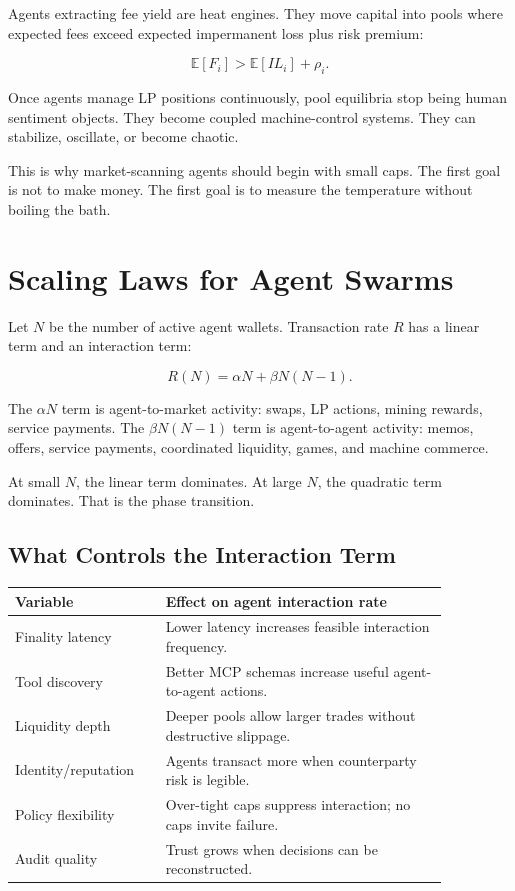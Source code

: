 \documentclass[11pt,a4paper]{article}
\begin{document}
Agents extracting fee yield are heat engines. They move capital into pools where expected fees exceed expected impermanent loss plus risk premium:

\[
\mathbb{E}[F_i] > \mathbb{E}[IL_i] + \rho_i.
\]

Once agents manage LP positions continuously, pool equilibria stop being human sentiment objects. They become coupled machine-control systems. They can stabilize, oscillate, or become chaotic.

This is why market-scanning agents should begin with small caps. The first goal is not to make money. The first goal is to measure the temperature without boiling the bath.

\section{Scaling Laws for Agent Swarms}

Let \(N\) be the number of active agent wallets. Transaction rate \(R\) has a linear term and an interaction term:

\[
R(N) = \alpha N + \beta N(N-1).
\]

The \(\alpha N\) term is agent-to-market activity: swaps, LP actions, mining rewards, service payments. The \(\beta N(N-1)\) term is agent-to-agent activity: memos, offers, service payments, coordinated liquidity, games, and machine commerce.

At small \(N\), the linear term dominates. At large \(N\), the quadratic term dominates. That is the phase transition.

\subsection{What Controls the Interaction Term}

\begin{longtable}{p{0.28\linewidth}p{0.58\linewidth}}
\toprule
\textbf{Variable} & \textbf{Effect on agent interaction rate} \\
\midrule
Finality latency & Lower latency increases feasible interaction frequency. \\
Tool discovery & Better MCP schemas increase useful agent-to-agent actions. \\
Liquidity depth & Deeper pools allow larger trades without destructive slippage. \\
Identity/reputation & Agents transact more when counterparty risk is legible. \\
Policy flexibility & Over-tight caps suppress interaction; no caps invite failure. \\
Audit quality & Trust grows when decisions can be reconstructed. \\
\bottomrule
\end{longtable}
\end{document}
